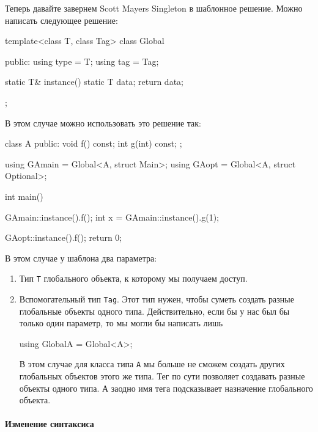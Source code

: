 Теперь давайте завернем Scott Mayers Singleton в шаблонное решение.
Можно написать следующее решение:
\begin{cppcode}
template<class T, class Tag>
class Global {
public:
  using type = T;
  using tag = Tag;

  static T& instance() {
    static T data;
    return data;
  }
};
\end{cppcode}
В этом случае можно использовать это решение так:
\begin{cppcode}
class A {
public:
  void f() const;
  int g(int) const;
};

using GAmain = Global<A, struct Main>;
using GAopt = Global<A, struct Optional>;

int main() {
  GAmain::instance().f();
  int x = GAmain::instance().g(1);
  
  GAopt::instance().f();
  return 0;
}
\end{cppcode}
В этом случае у шаблона два параметра:
\begin{enumerate}
\item Тип \verb"T" глобального объекта, к которому мы получаем доступ.

\item Вспомогательный тип \verb"Tag".
Этот тип нужен, чтобы суметь создать разные глобальные объекты одного типа.
Действительно, если бы у нас был бы только один параметр, то мы могли бы написать лишь
\begin{cppcode}
using GlobalA = Global<A>;
\end{cppcode}
В этом случае для класса типа \verb"A" мы больше не сможем создать других глобальных объектов этого же типа.
Тег по сути позволяет создавать разные объекты одного типа.
А заодно имя тега подсказывает назначение глобального объекта.
\end{enumerate}

\paragraph{Изменение синтаксиса}

